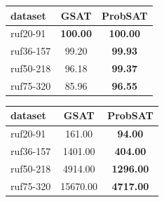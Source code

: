 \documentclass[11pt]{article}
\begin{document}
\setlength{\tabcolsep}{9pt}
\begin{center}
  \begin{minipage}{0.48\textwidth}
    \label{tab:success}
    \begin{tabular}{lcc}
      \toprule
      dataset & GSAT & ProbSAT \\
      \midrule
      ruf20-91 & \textbf{100.00} & \textbf{100.00} \\
      ruf36-157 & 99.20 & \textbf{99.93} \\
      ruf50-218 & 96.18 & \textbf{99.37} \\
      ruf75-320 & 85.96 & \textbf{96.55} \\
      \bottomrule
    \end{tabular}
  \end{minipage}
  \hfill
  \begin{minipage}{0.48\textwidth}
    \label{tab:par10}
    \begin{tabular}{lcc}
      \toprule
      dataset & GSAT & ProbSAT \\
      \midrule
      ruf20-91 & 161.00 & \textbf{94.00} \\
      ruf36-157 & 1401.00 & \textbf{404.00} \\
      ruf50-218 & 4914.00 & \textbf{1296.00} \\
      ruf75-320 & 15670.00 & \textbf{4717.00} \\
      \bottomrule
    \end{tabular}
  \end{minipage}
\end{center}
\end{document}
